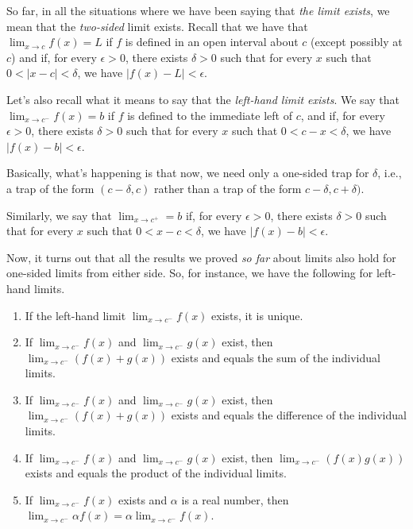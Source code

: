\documentclass[10pt]{amsart}
\begin{document}
So far, in all the situations where we have been saying that {\em the
limit exists}, we mean that the {\em two-sided} limit exists. Recall
that we have that $\lim_{x \to c} f(x) = L$ if $f$ is defined in an
open interval about $c$ (except possibly at $c$) and if, for every
$\epsilon > 0$, there exists $\delta > 0$ such that for every $x$ such
that $0 < |x - c| < \delta$, we have $|f(x) - L| < \epsilon$.

Let's also recall what it means to say that the {\em left-hand limit
exists}. We say that $\lim_{x \to c^-} f(x) = b$ if $f$ is defined to
the immediate left of $c$, and if, for every $\epsilon > 0$, there
exists $\delta > 0$ such that for every $x$ such that $0 < c - x <
\delta$, we have $|f(x) - b| < \epsilon$.

Basically, what's happening is that now, we need only a one-sided trap
for $\delta$, i.e., a trap of the form $(c - \delta, c)$ rather than a
trap of the form $c - \delta, c + \delta)$.

Similarly, we say that $\lim_{x \to c^+} = b$ if, for every $\epsilon
> 0$, there exists $\delta > 0$ such that for every $x$ such that $0 <
x - c < \delta$, we have $|f(x) - b| < \epsilon$.

Now, it turns out that all the results we proved {\em so far} about
limits also hold for one-sided limits from either side. So, for
instance, we have the following for left-hand limits.

\begin{enumerate}

\item If the left-hand limit $\lim_{x \to c^-} f(x)$ exists, it is
  unique.
\item If $\lim_{x \to c^-} f(x)$ and $\lim_{x \to c^-} g(x)$ exist,
  then $\lim_{x \to c^-} (f(x) + g(x))$ exists and equals the sum of
  the individual limits.
\item If $\lim_{x \to c^-} f(x)$ and $\lim_{x \to c^-} g(x)$ exist,
  then $\lim_{x \to c^-} (f(x) + g(x))$ exists and equals the
  difference of the individual limits.
\item If $\lim_{x \to c^-} f(x)$ and $\lim_{x \to c^-} g(x)$ exist,
  then $\lim_{x \to c^-} (f(x)g(x))$ exists and equals the product of
  the individual limits.
\item If $\lim_{x \to c^-} f(x)$ exists and $\alpha$ is a real number,
  then $\lim_{x \to c^-} \alpha f(x) = \alpha \lim_{x \to c^-} f(x)$.

\end{enumerate}
\end{document}
